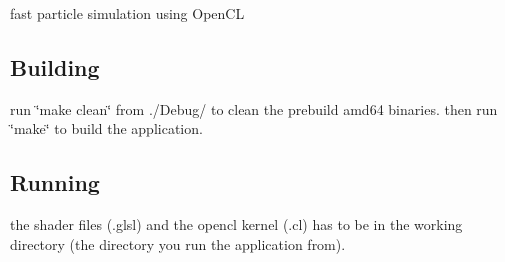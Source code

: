 fast particle simulation using Open\-C\-L

\subsection*{Building }

run \char`\"{}make clean\char`\"{} from ./\-Debug/ to clean the prebuild amd64 binaries. then run \char`\"{}make\char`\"{} to build the application.

\subsection*{Running }

the shader files (.glsl) and the opencl kernel (.cl) has to be in the working directory (the directory you run the application from). 
